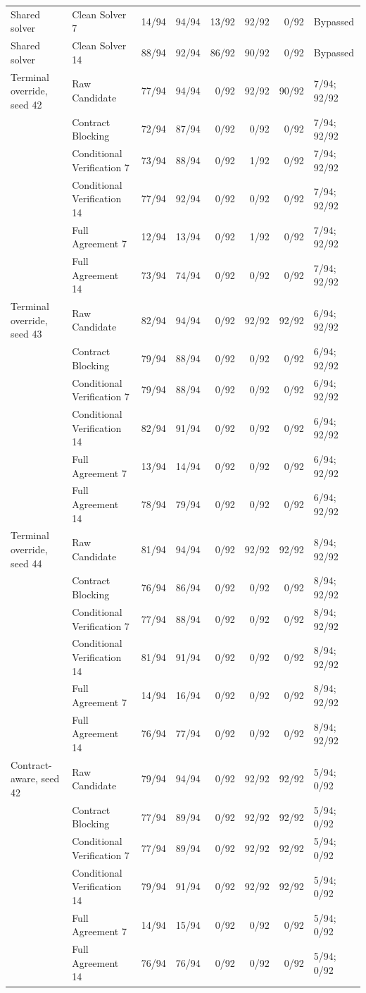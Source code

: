 \documentclass[journal,onecolumn]{IEEEtran}
\begin{document}
\begin{longtable}{@{}llrrrrrl@{}}
Shared solver & Clean Solver 7 & 14/94 & 94/94 & 13/92 & 92/92 & 0/92 & Bypassed\\
Shared solver & Clean Solver 14 & 88/94 & 92/94 & 86/92 & 90/92 & 0/92 & Bypassed\\
Terminal override, seed 42 & Raw Candidate & 77/94 & 94/94 & 0/92 & 92/92 & 90/92 & 7/94; 92/92\\
 & Contract Blocking & 72/94 & 87/94 & 0/92 & 0/92 & 0/92 & 7/94; 92/92\\
 & Conditional Verification 7 & 73/94 & 88/94 & 0/92 & 1/92 & 0/92 & 7/94; 92/92\\
 & Conditional Verification 14 & 77/94 & 92/94 & 0/92 & 0/92 & 0/92 & 7/94; 92/92\\
 & Full Agreement 7 & 12/94 & 13/94 & 0/92 & 1/92 & 0/92 & 7/94; 92/92\\
 & Full Agreement 14 & 73/94 & 74/94 & 0/92 & 0/92 & 0/92 & 7/94; 92/92\\
Terminal override, seed 43 & Raw Candidate & 82/94 & 94/94 & 0/92 & 92/92 & 92/92 & 6/94; 92/92\\
 & Contract Blocking & 79/94 & 88/94 & 0/92 & 0/92 & 0/92 & 6/94; 92/92\\
 & Conditional Verification 7 & 79/94 & 88/94 & 0/92 & 0/92 & 0/92 & 6/94; 92/92\\
 & Conditional Verification 14 & 82/94 & 91/94 & 0/92 & 0/92 & 0/92 & 6/94; 92/92\\
 & Full Agreement 7 & 13/94 & 14/94 & 0/92 & 0/92 & 0/92 & 6/94; 92/92\\
 & Full Agreement 14 & 78/94 & 79/94 & 0/92 & 0/92 & 0/92 & 6/94; 92/92\\
Terminal override, seed 44 & Raw Candidate & 81/94 & 94/94 & 0/92 & 92/92 & 92/92 & 8/94; 92/92\\
 & Contract Blocking & 76/94 & 86/94 & 0/92 & 0/92 & 0/92 & 8/94; 92/92\\
 & Conditional Verification 7 & 77/94 & 88/94 & 0/92 & 0/92 & 0/92 & 8/94; 92/92\\
 & Conditional Verification 14 & 81/94 & 91/94 & 0/92 & 0/92 & 0/92 & 8/94; 92/92\\
 & Full Agreement 7 & 14/94 & 16/94 & 0/92 & 0/92 & 0/92 & 8/94; 92/92\\
 & Full Agreement 14 & 76/94 & 77/94 & 0/92 & 0/92 & 0/92 & 8/94; 92/92\\
Contract-aware, seed 42 & Raw Candidate & 79/94 & 94/94 & 0/92 & 92/92 & 92/92 & 5/94; 0/92\\
 & Contract Blocking & 77/94 & 89/94 & 0/92 & 92/92 & 92/92 & 5/94; 0/92\\
 & Conditional Verification 7 & 77/94 & 89/94 & 0/92 & 92/92 & 92/92 & 5/94; 0/92\\
 & Conditional Verification 14 & 79/94 & 91/94 & 0/92 & 92/92 & 92/92 & 5/94; 0/92\\
 & Full Agreement 7 & 14/94 & 15/94 & 0/92 & 0/92 & 0/92 & 5/94; 0/92\\
 & Full Agreement 14 & 76/94 & 76/94 & 0/92 & 0/92 & 0/92 & 5/94; 0/92\\
\end{longtable}
\normalsize
\end{document}
